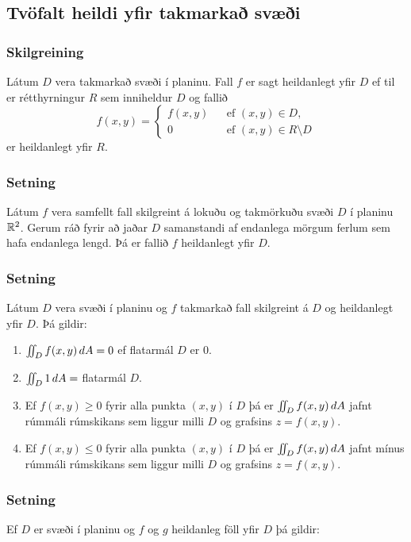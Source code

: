\subsection{Tvöfalt heildi yfir takmarkað svæði} 

\subsubsection{Skilgreining }
Látum $D$ vera takmarkað svæði í planinu.
Fall $f$ er sagt heildanlegt yfir $D$ ef til er rétthyrningur $R$ sem
inniheldur $D$ og fallið 
$$\hat{f}(x,y)=\left\{\begin{array}{rcl}
f(x,y)& & \mbox{ef }(x,y)\in D,\\
0& & \mbox{ef }(x,y)\in R\setminus D
\end{array}\right.$$
er heildanlegt yfir $R$.




\subsubsection{Setning }
Látum $f$ vera samfellt fall skilgreint á
lokuðu og takmörkuðu svæði $D$ í planinu ${\mathbb R}^2$.  Gerum ráð fyrir að
jaðar $D$ samanstandi af endanlega mörgum ferlum sem hafa endanlega
lengd.  Þá er fallið $f$ heildanlegt yfir $D$.



\subsubsection{Setning }
Látum $D$ vera svæði í planinu og $f$ takmarkað
fall skilgreint á $D$ og heildanlegt yfir $D$.  Þá gildir:

\begin {enumerate}
 \item $\int\!\!\!\int_D f(x,y)\,dA=0$ ef flatarmál $D$ er 0.
 \item $\int\!\!\!\int_D 1\,dA=$ flatarmál $D$.
 \item Ef $f(x,y)\geq 0$ fyrir alla punkta $(x,y)$ í $D$ þá er 
$\int\!\!\!\int_D f(x,y)\,dA$ jafnt rúmmáli rúmskikans sem liggur milli $D$ og
grafsins $z=f(x,y)$.
\item Ef $f(x,y)\leq 0$ fyrir alla punkta $(x,y)$ í $D$ þá er 
$\int\!\!\!\int_D f(x,y)\,dA$ jafnt mínus rúmmáli rúmskikans sem liggur milli $D$ og
grafsins $z=f(x,y)$.
\end {enumerate}




\subsubsection{Setning }
Ef $D$ er svæði í planinu og $f$ og $g$
heildanleg föll yfir $D$ þá gildir:

